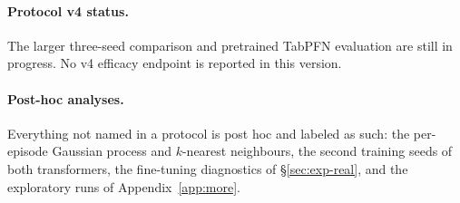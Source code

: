 \paragraph{Protocol v4 status.} The larger three-seed comparison and pretrained TabPFN evaluation are still
in progress. No v4 efficacy endpoint is reported in this version.


\paragraph{Post-hoc analyses.} Everything not named in a protocol is post hoc and labeled as such: the per-episode
Gaussian process and $k$-nearest neighbours, the second training seeds of both transformers, the fine-tuning diagnostics of \S\ref{sec:exp-real}, and the exploratory runs of
Appendix~\ref{app:more}.
